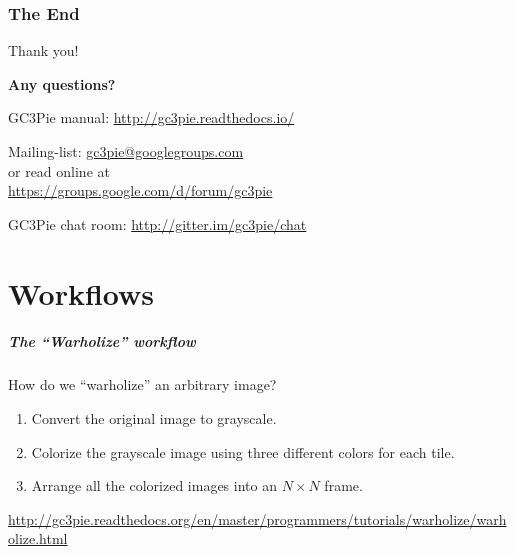 \documentclass[english,serif,mathserif,usenames,dvipsnames]{beamer}
\begin{document}


\section{The End}

\begin{frame}[fragile]
  \begin{center}
    Thank you!

    \+
    {\Huge \textbf{Any questions?}}

    \+\+
    GC3Pie manual: \url{http://gc3pie.readthedocs.io/}

    \+\+
    Mailing-list: \url{gc3pie@googlegroups.com} \\
    or read online at \\
    \url{https://groups.google.com/d/forum/gc3pie}

    \+\+
    GC3Pie chat room:
    \url{http://gitter.im/gc3pie/chat}
  \end{center}
\end{frame}


\part{Workflows}

\begin{frame}[label=workflows]
  \frametitle{The ``Warholize'' workflow}
How do we ``warholize'' an arbitrary image?

\+
\begin{enumerate}
\item Convert the original image to grayscale.
\item Colorize the grayscale image using three different colors for each tile.
\item Arrange all the colorized images into an $N\times N$ frame.
\end{enumerate}

\+
\begin{references}
  \url{http://gc3pie.readthedocs.org/en/master/programmers/tutorials/warholize/warholize.html}
\end{references}
\end{frame}
\end{document}
